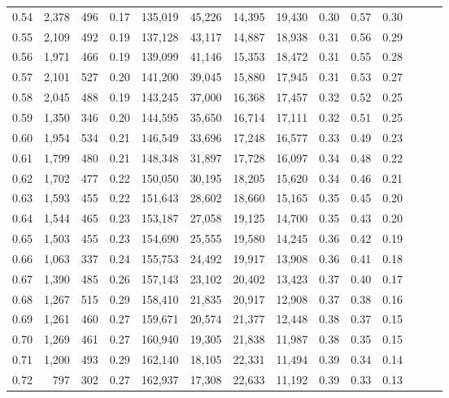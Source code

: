 \begin{tabular}{rrrrrrrrrrrrrr}
0.54 &  2,378 &    496 &  0.17 &  135,019 &   45,226 &  14,395 &  19,430 &  0.30 &  0.57 &      0.30 \\
0.55 &  2,109 &    492 &  0.19 &  137,128 &   43,117 &  14,887 &  18,938 &  0.31 &  0.56 &      0.29 \\
0.56 &  1,971 &    466 &  0.19 &  139,099 &   41,146 &  15,353 &  18,472 &  0.31 &  0.55 &      0.28 \\
0.57 &  2,101 &    527 &  0.20 &  141,200 &   39,045 &  15,880 &  17,945 &  0.31 &  0.53 &      0.27 \\
0.58 &  2,045 &    488 &  0.19 &  143,245 &   37,000 &  16,368 &  17,457 &  0.32 &  0.52 &      0.25 \\
0.59 &  1,350 &    346 &  0.20 &  144,595 &   35,650 &  16,714 &  17,111 &  0.32 &  0.51 &      0.25 \\
0.60 &  1,954 &    534 &  0.21 &  146,549 &   33,696 &  17,248 &  16,577 &  0.33 &  0.49 &      0.23 \\
0.61 &  1,799 &    480 &  0.21 &  148,348 &   31,897 &  17,728 &  16,097 &  0.34 &  0.48 &      0.22 \\
0.62 &  1,702 &    477 &  0.22 &  150,050 &   30,195 &  18,205 &  15,620 &  0.34 &  0.46 &      0.21 \\
0.63 &  1,593 &    455 &  0.22 &  151,643 &   28,602 &  18,660 &  15,165 &  0.35 &  0.45 &      0.20 \\
0.64 &  1,544 &    465 &  0.23 &  153,187 &   27,058 &  19,125 &  14,700 &  0.35 &  0.43 &      0.20 \\
0.65 &  1,503 &    455 &  0.23 &  154,690 &   25,555 &  19,580 &  14,245 &  0.36 &  0.42 &      0.19 \\
0.66 &  1,063 &    337 &  0.24 &  155,753 &   24,492 &  19,917 &  13,908 &  0.36 &  0.41 &      0.18 \\
0.67 &  1,390 &    485 &  0.26 &  157,143 &   23,102 &  20,402 &  13,423 &  0.37 &  0.40 &      0.17 \\
0.68 &  1,267 &    515 &  0.29 &  158,410 &   21,835 &  20,917 &  12,908 &  0.37 &  0.38 &      0.16 \\
0.69 &  1,261 &    460 &  0.27 &  159,671 &   20,574 &  21,377 &  12,448 &  0.38 &  0.37 &      0.15 \\
0.70 &  1,269 &    461 &  0.27 &  160,940 &   19,305 &  21,838 &  11,987 &  0.38 &  0.35 &      0.15 \\
0.71 &  1,200 &    493 &  0.29 &  162,140 &   18,105 &  22,331 &  11,494 &  0.39 &  0.34 &      0.14 \\
0.72 &    797 &    302 &  0.27 &  162,937 &   17,308 &  22,633 &  11,192 &  0.39 &  0.33 &      0.13 \\

\end{tabular}
